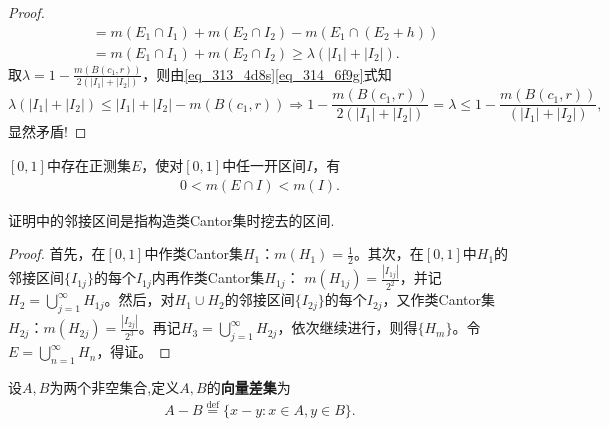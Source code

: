 \documentclass[../../main.tex]{subfiles}%
\begin{document}
\begin{proof}
\begin{align}
&= m\left( E_1\cap I_1 \right) +m\left( E_2\cap I_2 \right) -m\left( E_1\cap \left( E_2+h \right) \right) \nonumber\\
&= m\left( E_1\cap I_1 \right) +m\left( E_2\cap I_2 \right)
\geqslant \lambda \left( \left| I_1 \right|+\left| I_2 \right| \right).
\end{align}
取$\lambda =1-\frac{m\left( B\left( c_1,r \right) \right)}{2\left( \left| I_1 \right|+\left| I_2 \right| \right)}$，则由\eqref{eq_313_4d8s}\eqref{eq_314_6f9g}式知
$$\lambda \left( \left| I_1 \right|+\left| I_2 \right| \right) \leqslant \left| I_1 \right|+\left| I_2 \right|-m\left( B\left( c_1,r \right) \right)
\Longrightarrow 1-\frac{m\left( B\left( c_1,r \right) \right)}{2\left( \left| I_1 \right|+\left| I_2 \right| \right)}=\lambda \leqslant 1-\frac{m\left( B\left( c_1,r \right) \right)}{\left( \left| I_1 \right|+\left| I_2 \right| \right)},$$
显然矛盾!
\end{proof}


\begin{proposition}\label{proposition:正测集与区间交测度小于区间}
\([0,1]\)中存在正测集\(E\)，使对\([0,1]\)中任一开区间\(I\)，有
\begin{align*}
0 < m(E\cap I) < m(I).
\end{align*}
\end{proposition}
\begin{remark}
证明中的邻接区间是指构造类Cantor集时挖去的区间.
\end{remark}
\begin{proof}
首先，在\([0,1]\)中作类Cantor集\(H_1\)：\(m(H_1)=\frac{1}{2}\)。其次，在\([0,1]\)中\(H_1\)的邻接区间\(\{I_{1j}\}\)的每个\(I_{1j}\)内再作类Cantor集\(H_{1j}\)：
\(m(H_{1j}) = \frac{|I_{1j}|}{2^2}\)，并记\(H_2 = \bigcup_{j = 1}^{\infty}H_{1j}\)。然后，对\(H_1\cup H_2\)的邻接区间\(\{I_{2j}\}\)的每个\(I_{2j}\)，又作类Cantor集\(H_{2j}\)：\(m(H_{2j}) =\frac{|I_{2j}|}{2^3}\)。再记\(H_3 = \bigcup_{j = 1}^{\infty}H_{2j}\)，依次继续进行，则得\(\{H_m\}\)。令\(E = \bigcup_{n = 1}^{\infty}H_n\)，得证。 
\end{proof}

\begin{definition}[向量差集]\label{definition:向量差集}
设$A,B$为两个非空集合,定义$A,B$的\textbf{向量差集}为
\begin{align*}
A - B \stackrel{\text{def}}{=} \{x - y: x\in A,y \in B\}.
\end{align*}
\end{definition}
\end{document}
